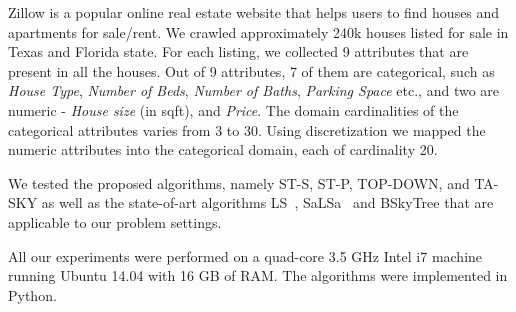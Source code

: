 \vspace{1mm}
Zillow is a popular online real estate website that helps users to find houses and apartments for sale/rent. We crawled approximately 240k houses listed for sale in Texas and Florida state. For each listing, we collected 9 attributes that are present in all the houses. Out of 9 attributes, 7 of them are categorical, such as \emph{House Type}, \emph{Number of Beds}, \emph{Number of Baths}, \emph{Parking Space} etc., and two are numeric - \emph{House size} (in sqft), and \emph{Price}. The domain cardinalities of the categorical attributes varies from 3 to 30. Using discretization we mapped the numeric attributes into the categorical domain, each of cardinality 20. 


We tested the proposed algorithms, namely ST-S, ST-P, TOP-DOWN, and TA-SKY as well as the state-of-art algorithms LS~\cite{morse2007efficient}, SaLSa~\cite{bartolini2008efficient} and BSkyTree \cite{lee2014scalable} that are applicable to our problem settings. 





 All our experiments were performed on a quad-core 3.5 GHz Intel i7 machine running Ubuntu 14.04 with 16 GB of RAM. The algorithms were implemented in Python.



